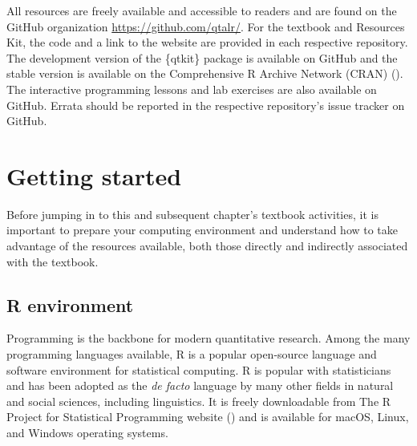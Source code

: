\documentclass[
  letterpaper,
  krantz1]{latex/krantz-mod}
\theoremstyle{definition}
\theoremstyle{definition}
\theoremstyle{remark}
\begin{document}
All resources are freely available and accessible to readers and are
found on the GitHub organization \url{https://github.com/qtalr/}. For
the textbook and Resources Kit, the code and a link to the website are
provided in each respective repository. The development version of the
\{qtkit\} package is available on GitHub and the stable version is
available on the
Comprehensive R Archive
Network (CRAN) (). The interactive
programming lessons and lab exercises are also available on GitHub.
Errata should be reported in the respective repository's issue tracker
on GitHub.

\section*{Getting started}\label{sec-preface-getting-started}


Before jumping in to this and subsequent chapter's textbook activities,
it is important to prepare your computing
environment and understand how to take advantage of the resources
available, both those directly and indirectly associated with the
textbook.

\subsection*{R environment}\label{sec-preface-r-environment}

Programming is the backbone for modern quantitative research. Among the
many programming languages available, R is a popular
open-source language and software environment for
statistical computing. R is popular with statisticians and has been
adopted as the \emph{de facto} language by many other fields in natural
and social sciences, including linguistics. It is freely downloadable
from The R Project for Statistical Programming website
() and is
available for macOS, Linux, and Windows operating
systems.
\end{document}
